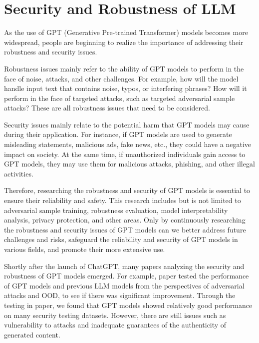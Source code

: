 \documentclass[conference]{IEEEtran}
\begin{document}
\section{Security and Robustness of LLM}
\par As the use of GPT (Generative Pre-trained Transformer) models becomes more widespread, 
people are beginning to realize the importance of addressing their robustness and security 
issues.

\par Robustness issues mainly refer to the ability of GPT models to perform in the face of noise, 
attacks, and other challenges. For example, how will the model handle input text that contains noise, 
typos, or interfering phrases? How will it perform in the face of targeted attacks, such as targeted 
adversarial sample attacks? These are all robustness issues that need to be considered.

\par Security issues mainly relate to the potential harm that GPT models 
may cause during their application. For instance, if GPT models are used to generate 
misleading statements, malicious ads, fake news, etc., they could have a negative impact 
on society. At the same time, if unauthorized individuals gain access to GPT models, 
they may use them for malicious attacks, phishing, and other illegal activities.

\par Therefore, researching the robustness and security of GPT models is essential 
to ensure their reliability and safety. This research includes but is not limited 
to adversarial sample training, robustness evaluation, model interpretability analysis, 
privacy protection, and other areas. Only by continuously researching the robustness 
and security issues of GPT models can we better address future challenges and risks, 
safeguard the reliability and security of GPT models in various fields, and promote 
their more extensive use.

\par Shortly after the launch of ChatGPT, many papers analyzing the security and 
robustness of GPT models emerged. For example, paper \cite{wang2023robustness} 
tested the performance of GPT models and previous LLM models from the 
perspectives of adversarial attacks and OOD, to see if there was significant improvement. 
Through the testing in paper, we found that GPT models showed relatively good performance 
on many security testing datasets. However, there are still issues such as vulnerability 
to attacks and inadequate guarantees of the authenticity of generated content.
\end{document}
